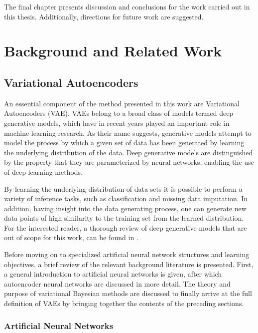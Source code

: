 The final chapter presents discussion and conclusions for the work carried out in this thesis. Additionally, directions for future work are suggested.

\chapter{Background and Related Work}
\label{ch:background_and_related_work}

\section{Variational Autoencoders}
\label{section:variational_autoencoders}

An essential component of the method presented in this work are Variational Autoencoders (VAE). VAEs belong to a broad class of models termed deep generative models, which have in recent years played an important role in machine learning research. As their name suggests, generative models attempt to model the process by which a given set of data has been generated by learning the underlying distribution of the data. Deep generative models are distinguished by the property that they are parameterized by neural networks, enabling the use of deep learning methods.

By learning the underlying distribution of data sets it is possible to perform a variety of inference tasks, such as classification and missing data imputation. In addition, having insight into the data generating process, one can generate new data points of high similarity to the training set from the learned distribution. For the interested reader, a thorough review of deep generative models that are out of scope for this work, can be found in \cite[Chapter~20]{deep_learning_book}.

Before moving on to specialized artificial neural network structures and learning objectives, a brief review of the relevant background literature is presented. First, a general introduction to artificial neural networks is given, after which autoencoder neural networks are discussed in more detail. The theory and purpose of variational Bayesian methods are discussed to finally arrive at the full definition of VAEs by bringing together the contents of the preceding sections.

\subsection{Artificial Neural Networks}
\label{section:artificial_neural_networks}

